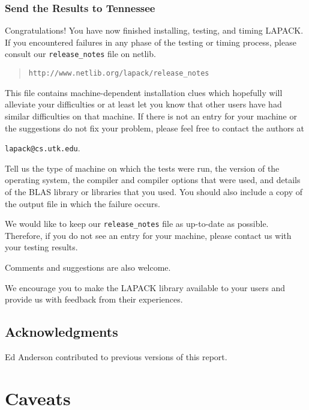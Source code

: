 \subsection{Send the Results to Tennessee}\label{sendresults}

\dent
Congratulations!  You have now finished installing, testing, and
timing LAPACK.  If you encountered failures in any phase of the 
testing or timing process, please
consult our {\tt release\_notes} file on netlib.
\begin{quote}
{\tt http://www.netlib.org/lapack/release\_notes}
\end{quote}
This file contains machine-dependent installation clues which hopefully will 
alleviate your difficulties or at least let you know that other users
have had similar difficulties on that machine.  If there is not an entry
for your machine or the suggestions do not fix your problem, please feel
free to contact the authors at
\begin{list}{}{}
\item {\tt lapack@cs.utk.edu}.
\end{list}
Tell us the 
type of machine on which the tests were run, the version of the operating
system, the compiler and compiler options that were used,
and details of the BLAS library or libraries that you used.  You should
also include a copy of the output file in which the failure occurs.

We would like to keep our {\tt release\_notes} file as up-to-date as possible.
Therefore, if you do not see an entry for your machine, please contact us
with your testing results.

Comments and suggestions are also welcome.

We encourage you to make the LAPACK library available to your
users and provide us with feedback from their experiences.

\section*{Acknowledgments}

Ed Anderson contributed to previous versions of this report.

\appendix

\chapter{Caveats}\label{appendixd}

